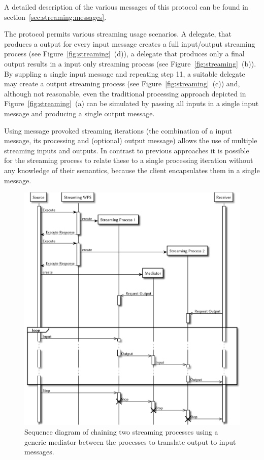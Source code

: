 	A detailed description of the various messages of this protocol can be found in section~\ref{sec:streaming:messages}.

	The protocol permits various streaming usage scenarios. A delegate, that produces a output for every input message creates a full input/output streaming process (see Figure~\ref{fig:streaming}~(d)), a delegate that produces only a final output results in a input only streaming process (see Figure~\ref{fig:streaming}~(b)). By suppling a single input message and repeating step 11, a suitable delegate may create a output streaming process (see Figure~\ref{fig:streaming}~(c)) and, although not reasonable, even the traditional processing approach depicted in Figure~\ref{fig:streaming}~(a) can be simulated by passing all inputs in a single input message and producing a single output message.

	Using message provoked streaming iterations (the combination of a input message, its processing and (optional) output message) allows the use of multiple streaming inputs and outputs. In contrast to previous approaches it is possible for the streaming process to relate these to a single processing iteration without any knowledge of their semantics, because the client encapsulates them in a single message.

	\begin{figure}[!htb]
		\centering
		\includegraphics[width=1\textwidth]{figures/sequence-diagramm-chain.pdf}
		\caption{\label{fig:sd:chain} Sequence diagram of chaining two streaming processes using a generic mediator between the processes to translate output to input messages.}
	\end{figure}

